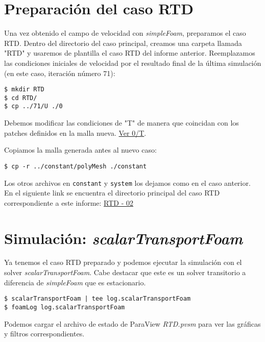 \documentclass{article}
\begin{document}
\section{Preparación del caso RTD}
Una vez obtenido el campo de velocidad con \textit{simpleFoam}, preparamos el caso RTD. Dentro del directorio del caso principal, creamos una carpeta llamada "RTD" y usaremos de plantilla el caso RTD del informe anterior.
Reemplazamos las condiciones iniciales de velocidad por el resultado final de la última simulación (en este caso, iteración número 71):
\begin{lstlisting}
$ mkdir RTD
$ cd RTD/
$ cp ../71/U ./0
\end{lstlisting}
Debemos modificar las condiciones de "T" de manera que coincidan con los patches definidos en la malla nueva. \href{https://github.com/guillerolle/casos_cfd/tree/master/02/RTD/0/T}{Ver 0/T}.\par
Copiamos la malla generada antes al nuevo caso:
\begin{lstlisting}
$ cp -r ../constant/polyMesh ./constant
\end{lstlisting}

Los otros archivos en \texttt{constant} y \texttt{system} los dejamos como en el caso anterior. En el siguiente link se encuentra el directorio principal del caso RTD correspondiente a este informe: \href{https://github.com/guillerolle/casos_cfd/tree/master/02/RTD}{RTD - 02}

\section{Simulación: \textit{scalarTransportFoam}}
Ya tenemos el caso RTD preparado y podemos ejecutar la simulación con el solver \textit{scalarTransportFoam}. Cabe destacar que este es un solver transitorio a diferencia de \textit{simpleFoam} que es estacionario.

\begin{lstlisting}
$ scalarTransportFoam | tee log.scalarTransportFoam
$ foamLog log.scalarTransportFoam
\end{lstlisting}

Podemos cargar el archivo de estado de ParaView \textit{RTD.pvsm} para ver las gráficas y filtros correspondientes.
\end{document}
